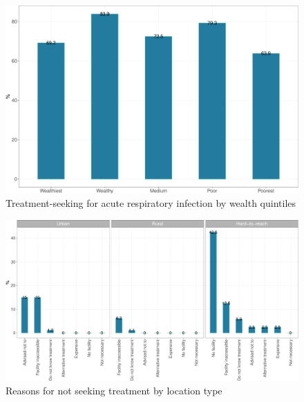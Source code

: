 \documentclass[12pt,a4paper]{article}
\begin{document}
\begin{figure}[H]

{\centering \includegraphics{kayahReport_files/figure-latex/ari2plot-1} 

}

\caption{Treatment-seeking for acute respiratory infection by wealth quintiles}\label{fig:ari2plot}
\end{figure}

\begin{figure}[H]

{\centering \includegraphics{kayahReport_files/figure-latex/ari4plot-1} 

}

\caption{Reasons for not seeking treatment by location type}\label{fig:ari4plot}
\end{figure}
\end{document}
